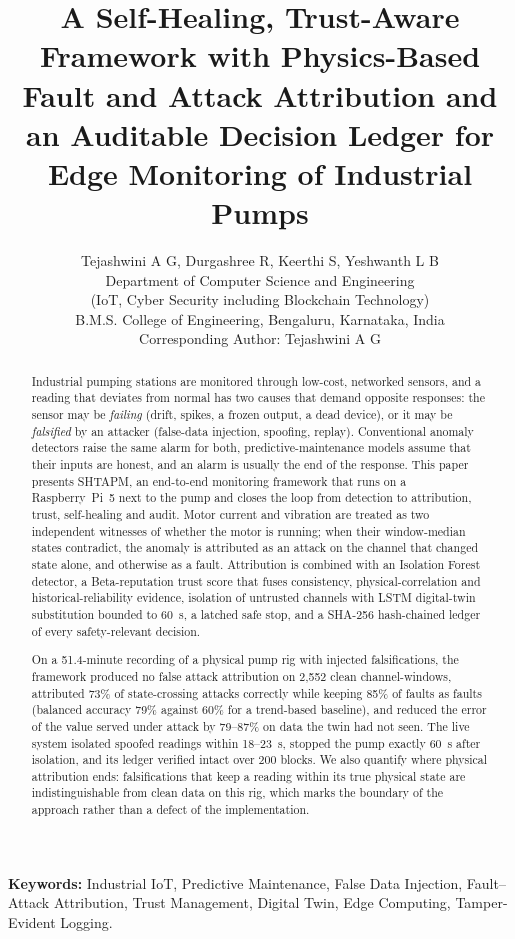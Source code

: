 \documentclass[11pt,a4paper]{article}
\title{A Self-Healing, Trust-Aware Framework with Physics-Based Fault and Attack Attribution and an Auditable Decision Ledger for Edge Monitoring of Industrial Pumps}
\author{Tejashwini A G, Durgashree R, Keerthi S, Yeshwanth L B\\[6pt]
Department of Computer Science and Engineering\\
(IoT, Cyber Security including Blockchain Technology)\\
B.M.S. College of Engineering, Bengaluru, Karnataka, India\\[6pt]
Corresponding Author: Tejashwini A G}
\date{}
\begin{document}
\maketitle
\thispagestyle{empty}

\begin{abstract}
\noindent Industrial pumping stations are monitored through low-cost, networked sensors, and a reading that deviates from normal has two causes that demand opposite responses: the sensor may be \emph{failing} (drift, spikes, a frozen output, a dead device), or it may be \emph{falsified} by an attacker (false-data injection, spoofing, replay). Conventional anomaly detectors raise the same alarm for both, predictive-maintenance models assume that their inputs are honest, and an alarm is usually the end of the response. This paper presents SHTAPM, an end-to-end monitoring framework that runs on a Raspberry~Pi~5 next to the pump and closes the loop from detection to attribution, trust, self-healing and audit. Motor current and vibration are treated as two independent witnesses of whether the motor is running; when their window-median states contradict, the anomaly is attributed as an attack on the channel that changed state alone, and otherwise as a fault. Attribution is combined with an Isolation Forest detector, a Beta-reputation trust score that fuses consistency, physical-correlation and historical-reliability evidence, isolation of untrusted channels with LSTM digital-twin substitution bounded to 60~s, a latched safe stop, and a SHA-256 hash-chained ledger of every safety-relevant decision.

On a 51.4-minute recording of a physical pump rig with injected falsifications, the framework produced no false attack attribution on 2,552 clean channel-windows, attributed 73\% of state-crossing attacks correctly while keeping 85\% of faults as faults (balanced accuracy 79\% against 60\% for a trend-based baseline), and reduced the error of the value served under attack by 79--87\% on data the twin had not seen. The live system isolated spoofed readings within 18--23~s, stopped the pump exactly 60~s after isolation, and its ledger verified intact over 200 blocks. We also quantify where physical attribution ends: falsifications that keep a reading within its true physical state are indistinguishable from clean data on this rig, which marks the boundary of the approach rather than a defect of the implementation.
\end{abstract}

\vspace{0.6em}
\noindent\textbf{Keywords:} Industrial IoT, Predictive Maintenance, False Data Injection, Fault--Attack Attribution, Trust Management, Digital Twin, Edge Computing, Tamper-Evident Logging.
\end{document}
